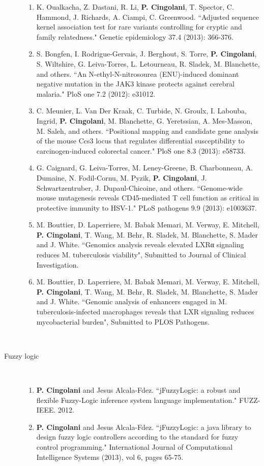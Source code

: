\begin{description}
		\begin{enumerate}[resume]
			\item K. Oualkacha, Z. Dastani, R. Li, \textbf{P. Cingolani}, T. Spector, C. Hammond, J. Richards, A. Ciampi, C. Greenwood. ``Adjusted sequence kernel association test for rare variants controlling for cryptic and family relatedness." Genetic epidemiology 37.4 (2013): 366-376.
			\item S. Bongfen, I. Rodrigue-Gervais, J. Berghout, S. Torre, \textbf{P. Cingolani}, S. Wiltshire, G. Leiva-Torres, L. Letourneau, R. Sladek, M. Blanchette, and others. ``An N-ethyl-N-nitrosourea (ENU)-induced dominant negative mutation in the JAK3 kinase protects against cerebral malaria." PloS one 7.2 (2012): e31012.
			\item C. Meunier, L. Van Der Kraak, C. Turbide, N. Groulx, I. Labouba, Ingrid, \textbf{P. Cingolani}, M. Blanchette, G. Yeretssian, A. Mes-Masson, M. Saleh, and others. ``Positional mapping and candidate gene analysis of the mouse Ccs3 locus that regulates differential susceptibility to carcinogen-induced colorectal cancer." PloS one 8.3 (2013): e58733.
			\item G. Caignard, G. Leiva-Torres, M. Leney-Greene, B. Charbonneau, A. Dumaine, N. Fodil-Cornu, M. Pyzik, \textbf{P. Cingolani}, J. Schwartzentruber, J. Dupaul-Chicoine, and others. ``Genome-wide mouse mutagenesis reveals CD45-mediated T cell function as critical in protective immunity to HSV-1." PLoS pathogens 9.9 (2013): e1003637.
			\item M. Bouttier, D. Laperriere, M. Babak Memari, M. Verway, E. Mitchell, \textbf{P. Cingolani}, T. Wang, M. Behr, R. Sladek, M. Blanchette, S. Mader and J. White. ``Genomics analysis reveals elevated LXRα signaling reduces M. tuberculosis viability", Submitted to Journal of Clinical Investigation.
			\item M. Bouttier, D. Laperriere, M. Babak Memari, M. Verway, E. Mitchell, \textbf{P. Cingolani}, T. Wang, M. Behr, R. Sladek, M. Blanchette, S. Mader and J. White. ``Genomic analysis of enhancers engaged in M. tuberculosis-infected macrophages reveals that LXR signaling reduces mycobacterial burden", Submitted to PLOS Pathogens.
		\end{enumerate}	
		~ \\
	
	\item[Fuzzy logic] ~

		\begin{enumerate}[resume]
			\item \textbf{P. Cingolani} and Jesus Alcala-Fdez. ``jFuzzyLogic: a robust and flexible Fuzzy-Logic inference system language implementation." FUZZ-IEEE. 2012.
			\item \textbf{P. Cingolani} and Jesus Alcala-Fdez. ``jFuzzyLogic: a java library to design fuzzy logic controllers according to the standard for fuzzy control programming." International Journal of Computational Intelligence Systems (2013), vol 6, pages 65-75.
		\end{enumerate}	

\end{description}
